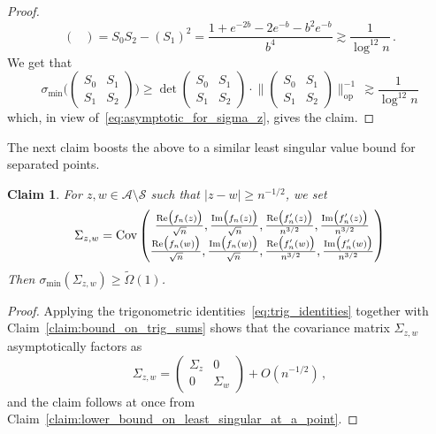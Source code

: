 \documentclass[11pt]{amsart}
\newtheorem{claim}[theorem]{Claim}
\theoremstyle{remark}
\theoremstyle{definition}
\newcommand{\cA}{\mathcal A}
\newcommand{\Cov}{\operatorname{Cov}}
\begin{document}
\begin{proof}
\[\begin{pmatrix}
        \end{pmatrix} = S_0 S_2 - (S_1)^2 = \frac{1+e^{-2b}-2e^{-b}-b^2e^{-b}}{b^4} \gtrsim \frac{1}{\log^{12}n} \, .
        \]
        We get that
        \[
        \sigma_{\min}\bigg(\begin{pmatrix}
                S_0 & S_1 \\ S_1 & S_2
            \end{pmatrix}\bigg) \ge \det\begin{pmatrix}
            S_0 & S_1 \\ S_1 & S_2
        \end{pmatrix} \cdot \bigg\| \begin{pmatrix}
            S_0 & S_1 \\ S_1 & S_2
        \end{pmatrix} \bigg\|_{\text{op}}^{-1} \,  \gtrsim \frac{1}{\log^{12}n}
        \]
        which, in view of~\eqref{eq:asymptotic_for_sigma_z}, gives the claim. 
    \end{proof}
    The next claim boosts the above to a similar least singular value bound for separated points.
    \begin{claim}
    \label{claim:least_singular_lower_bound_for_separated}
        For $z,w\in \cA\setminus \mathcal{S}$ such that $|z-w|\ge n^{-1/2}$, we set
        \[
        \Sigma_{z,w}  = \Cov \begin{pmatrix}
            \frac{\text{\normalfont Re}\big(f_n(z)\big)}{\sqrt{n}} , \frac{\text{\normalfont Im}\big(f_n(z)\big)}{\sqrt{n}} , \frac{\text{\normalfont Re}\big(f_n^\prime(z)\big)}{n^{3/2}} , \frac{\text{\normalfont Im}\big(f_n^\prime(z)\big)}{n^{3/2}} \\ \frac{\text{\normalfont Re}\big(f_n(w)\big)}{\sqrt{n}} , \frac{\text{\normalfont Im}\big(f_n(w)\big)}{\sqrt{n}} , \frac{\text{\normalfont Re}\big(f_n^\prime(w)\big)}{n^{3/2}} , \frac{\text{\normalfont Im}\big(f_n^\prime(w)\big)}{n^{3/2}}    
        \end{pmatrix}
        \]
        Then $\sigma_{\min}(\Sigma_{z,w}) \ge \widetilde\Omega(1)$.
    \end{claim}
    \begin{proof}
        Applying the trigonometric identities~\eqref{eq:trig_identities} together with Claim~\ref{claim:bound_on_trig_sums} shows that the covariance matrix $\Sigma_{z,w}$ asymptotically factors as
        \begin{equation}
        \label{eq:covariance_for_separated_asymptotically_factors}
                   \Sigma_{z,w} = \begin{pmatrix}
            \Sigma_z & 0 \\ 0 & \Sigma_w
         \end{pmatrix} + O(n^{-1/2}) \, ,
        \end{equation}
        and the claim follows at once from Claim~\ref{claim:lower_bound_on_least_singular_at_a_point}.
    \end{proof}
\end{document}
